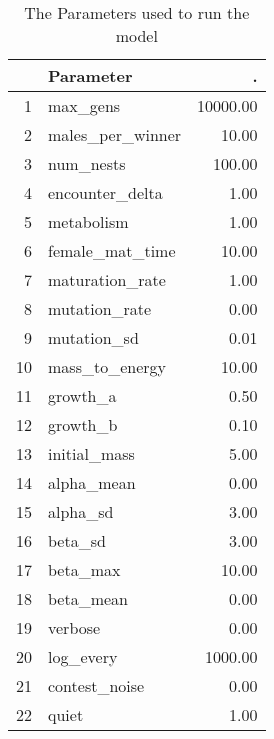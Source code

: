 \begin{table}[ht]
\centering
\begin{tabular}{rlr}
  \hline
 & Parameter & . \\ 
  \hline
1 & max\_gens & 10000.00 \\ 
  2 & males\_per\_winner & 10.00 \\ 
  3 & num\_nests & 100.00 \\ 
  4 & encounter\_delta & 1.00 \\ 
  5 & metabolism & 1.00 \\ 
  6 & female\_mat\_time & 10.00 \\ 
  7 & maturation\_rate & 1.00 \\ 
  8 & mutation\_rate & 0.00 \\ 
  9 & mutation\_sd & 0.01 \\ 
  10 & mass\_to\_energy & 10.00 \\ 
  11 & growth\_a & 0.50 \\ 
  12 & growth\_b & 0.10 \\ 
  13 & initial\_mass & 5.00 \\ 
  14 & alpha\_mean & 0.00 \\ 
  15 & alpha\_sd & 3.00 \\ 
  16 & beta\_sd & 3.00 \\ 
  17 & beta\_max & 10.00 \\ 
  18 & beta\_mean & 0.00 \\ 
  19 & verbose & 0.00 \\ 
  20 & log\_every & 1000.00 \\ 
  21 & contest\_noise & 0.00 \\ 
  22 & quiet & 1.00 \\ 
   \hline
\end{tabular}
\caption{The Parameters used to run the model} 
\end{table}
